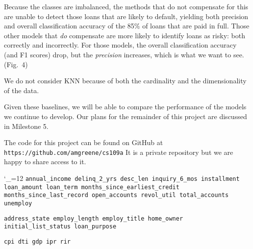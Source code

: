 \vskip 4pt
\vskip 4pt

Because the classes are imbalanced, the methods that do not compensate for this are unable to detect those loans that are likely to default, yielding both precision and overall classification accuracy of the 85\% of loans that are paid in full. Those other models that {\it do} compensate are more likely to identify loans as risky: both correctly and incorrectly. For those models, the overall classification accuracy (and F1 scores) drop, but the {\it precision} increases, which is what we want to see. (Fig.~4)

We do not consider KNN because of both the cardinality and the dimensionality of the data.

Given these baselines, we will be able to compare the performance of the models we continue to develop. Our plans for the remainder of this project are discussed in Milestone 5.

The code for this project can be found on GitHub at {\tt https://github.com/amgreene/cs109a} It is a private repository but we are happy to share access to it.

\singlecolumn\vfill\eject
{}

{\catcode`\_=12
{\tt annual_income
delinq_2_yrs 
desc_len
inquiry_6_mos
installment
loan_amount 
loan_term
months_since_earliest_credit
months_since_last_record
open_accounts
revol_util
total_accounts
unemploy}
\par{}
{\tt address_state
employ_length
employ_title
home_owner
initial_list_status
loan_purpose }
\par{}
{\tt cpi 
dti 
gdp 
ipr 
rir}
}


